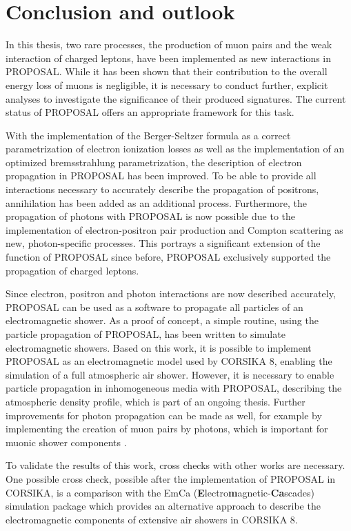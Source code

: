 \chapter{Conclusion and outlook} 

In this thesis, two rare processes, the production of muon pairs and the weak interaction of charged leptons, have been implemented as new interactions in PROPOSAL.
While it has been shown that their contribution to the overall energy loss of muons is negligible, it is necessary to conduct further, explicit analyses to investigate the significance of their produced signatures.
The current status of PROPOSAL offers an appropriate framework for this task.

With the implementation of the Berger-Seltzer formula as a correct parametrization of electron ionization losses as well as the implementation of an optimized bremsstrahlung parametrization, the description of electron propagation in PROPOSAL has been improved.
To be able to provide all interactions necessary to accurately describe the propagation of positrons, annihilation has been added as an additional process.
Furthermore, the propagation of photons with PROPOSAL is now possible due to the implementation of electron-positron pair production and Compton scattering as new, photon-specific processes.
This portrays a significant extension of the function of PROPOSAL since before, PROPOSAL exclusively supported the propagation of charged leptons.

Since electron, positron and photon interactions are now described accurately, PROPOSAL can be used as a software to propagate all particles of an electromagnetic shower.
As a proof of concept, a simple routine, using the particle propagation of PROPOSAL, has been written to simulate electromagnetic showers.
Based on this work, it is possible to implement PROPOSAL as an electromagnetic model used by CORSIKA 8, enabling the simulation of a full atmospheric air shower.
However, it is necessary to enable particle propagation in inhomogeneous media with PROPOSAL, describing the atmospheric density profile, which is part of an ongoing thesis.
Further improvements for photon propagation can be made as well, for example by implementing the creation of muon pairs by photons, which is important for muonic shower components \cite{corsika_physics}. 

To validate the results of this work, cross checks with other works are necessary.
One possible cross check, possible after the implementation of PROPOSAL in CORSIKA, is a comparison with the EmCa (\textbf{E}lectro\textbf{m}agnetic-\textbf{Ca}scades) simulation package \cite{meighenberger2019emca} which provides an alternative approach to describe the electromagnetic components of extensive air showers in CORSIKA 8.
